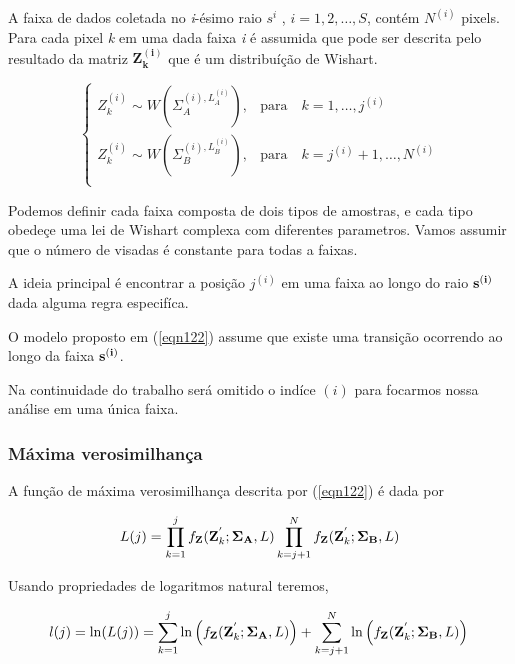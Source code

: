 \documentclass[12pt,a4paper]{article}
\begin{document}
A faixa de dados coletada no {\it i}-ésimo raio {\bf $s^{i}$} , $i=1,2,\dots, S$, contém $N^{(i)}$ pixels. Para cada pixel {\it k} em uma dada faixa {\it i} é assumida que pode ser descrita pelo resultado da matriz $\mathbf{Z_{k}^{(i)}}$ que é um distribuíção de Wishart.  


\begin{equation}\label{eqn122}
 \left\{
\begin{array}{cl}
	Z_{k}^{(i)}\sim W(\Sigma_{A}^{(i),L_{A}^{(i)}}),& \mbox{para}\quad k=1,\dots,j^{(i)}  \\
	Z_{k}^{(i)}\sim W(\Sigma_{B}^{(i),L_{B}^{(i)}}),& \mbox{para}\quad k=j^{(i)} + 1,\dots,N^{(i)}  \\
\end{array}
\right.
\end{equation}

Podemos definir cada faixa composta de dois tipos de amostras, e cada tipo obedeçe uma lei de Wishart complexa com diferentes parametros. Vamos assumir que o número de visadas é constante para todas a faixas.

A ideia principal é encontrar a posição $j^{(i)}$ em uma faixa ao longo do raio ${\bf s^{(i)}}$ dada alguma regra especifíca.

O modelo proposto em (\ref{eqn122}) assume que existe uma transição ocorrendo ao longo da faixa $\bf s^{(i)}$. 

Na continuidade do trabalho será omitido o indíce $(i)$ para focarmos nossa análise em uma única faixa.

\subsubsection{Máxima verosimilhança}

A função de máxima verosimilhança descrita por (\ref{eqn122}) é dada por

\begin{equation*}
	L(j)=\prod_{k=1}^{j}f_{\mathbf{Z}}(\mathbf{Z}_{k}^{'};\mathbf{\Sigma_{A}},L) \prod_{k=j+1}^{N}f_{\mathbf{Z}}(\mathbf{Z}_{k}^{'};\mathbf{\Sigma_{B}},L) \\
\end{equation*}

Usando propriedades de logaritmos natural teremos,


\begin{equation}\label{eqn123}
	l(j)=\ln(L(j))=\sum_{k=1}^{j}\ln\left(f_{\mathbf{Z}}(\mathbf{Z}_{k}^{'};\mathbf{\Sigma_{A}},L)\right)+ \sum_{k=j+1}^{N}\ln\left(f_{\mathbf{Z}}(\mathbf{Z}_{k}^{'};\mathbf{\Sigma_{B}},L)\right) \\
\end{equation}
\end{document}
